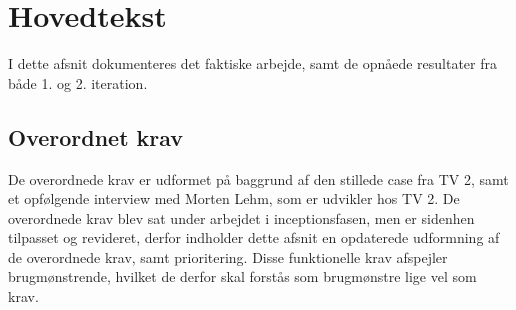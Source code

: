 \section{Hovedtekst}
I dette afsnit dokumenteres det faktiske arbejde, samt de opnåede resultater fra både 1. og 2. iteration.

\subsection{Overordnet krav}
De overordnede krav er udformet på baggrund af den stillede case fra TV 2, samt et opfølgende interview med Morten Lehm, som er udvikler hos TV 2. De overordnede krav blev sat under arbejdet i inceptionsfasen, men er sidenhen tilpasset og revideret, derfor indholder dette afsnit en opdaterede udformning af de overordnede krav, samt prioritering. Disse funktionelle krav afspejler brugmønstrende, hvilket de derfor skal forstås som brugmønstre lige vel som krav.

